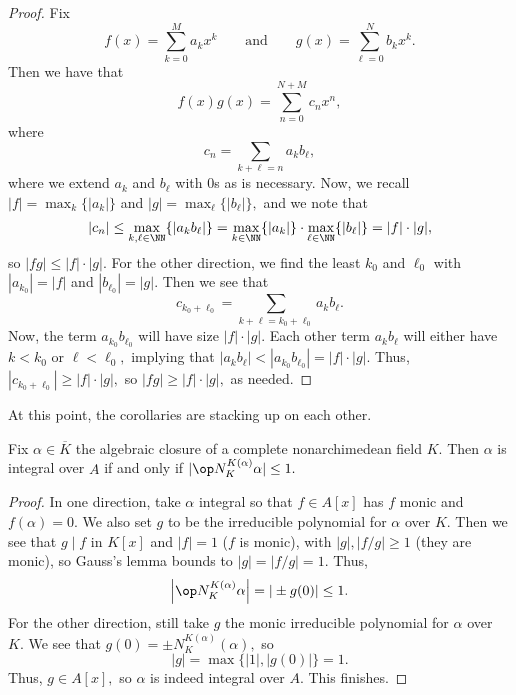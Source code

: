 \begin{proof}
	Fix
	\[f(x)=\sum_{k=0}^Ma_kx^k\qquad\text{and}\qquad g(x)=\sum_{\ell=0}^Nb_kx^k.\]
	Then we have that
	\[f(x)g(x)=\sum_{n=0}^{N+M}c_n x^n,\]
	where
	\[c_n=\sum_{k+\ell=n}a_kb_\ell,\]
	where we extend $a_k$ and $b_\ell$ with $0$s as is necessary. Now, we recall $|f|=\max_k\{|a_k|\}$ and $|g|=\max_\ell\{|b_\ell|\},$ and we note that
	\[|c_n|\le\max_{k,\ell\in\NN}\{|a_kb_\ell|\}=\max_{k\in\NN}\{|a_k|\}\cdot\max_{\ell\in\NN}\{|b_\ell|\}=|f|\cdot|g|,\]
	so $|fg|\le|f|\cdot|g|.$ For the other direction, we find the least $k_0$ and $\ell_0$ with $|a_{k_0}|=|f|$ and $|b_{\ell_0}|=|g|.$ Then we see that
	\[c_{k_0+\ell_0}=\sum_{k+\ell=k_0+\ell_0}a_kb_\ell.\]
	Now, the term $a_{k_0}b_{\ell_0}$ will have size $|f|\cdot|g|.$ Each other term $a_kb_\ell$ will either have $k<k_0$ or $\ell<\ell_0,$ implying that $|a_kb_\ell|<|a_{k_0}b_{\ell_0}|=|f|\cdot|g|.$ Thus, $|c_{k_0+\ell_0}|\ge|f|\cdot|g|,$ so $|fg|\ge|f|\cdot|g|,$ as needed.
\end{proof}
At this point, the corollaries are stacking up on each other.
\begin{corollary} \label{cor:corsquared}
	Fix $\alpha\in\overline K$ the algebraic closure of a complete nonarchimedean field $K.$ Then $\alpha$ is integral over $A$ if and only if $|\op N_K^{K(\alpha)}\alpha|\le1.$
\end{corollary}
\begin{proof}
	In one direction, take $\alpha$ integral so that $f\in A[x]$ has $f$ monic and $f(\alpha)=0.$ We also set $g$ to be the irreducible polynomial for $\alpha$ over $K.$ Then we see that $g\mid f$ in $K[x]$ and $|f|=1$ ($f$ is monic), with $|g|,|f/g|\ge1$ (they are monic), so Gauss's lemma bounds to $|g|=|f/g|=1.$ Thus,
	\[\left|\op N_K^{K(\alpha)}\alpha\right|=|\pm g(0)|\le1.\]
	For the other direction, still take $g$ the monic irreducible polynomial for $\alpha$ over $K.$ We see that $g(0)=\pm N_K^{K(\alpha)}(\alpha),$ so
	\[|g|=\max\{|1|,|g(0)|\}=1.\]
	Thus, $g\in A[x],$ so $\alpha$ is indeed integral over $A.$ This finishes.
\end{proof}